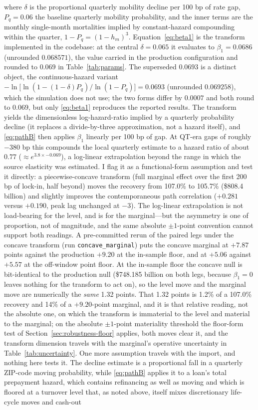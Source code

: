 \documentclass[12pt]{article}
\begin{document}
where $\delta$ is the proportional quarterly mobility decline per 100 bp of rate gap, $P_q = 0.06$ the baseline quarterly mobility probability, and the inner terms are the monthly single-month mortalities implied by constant-hazard compounding within the quarter, $1 - P_q = (1 - h_m)^3$. Equation~\eqref{eq:beta1} is the transform implemented in the codebase: at the central $\delta = 0.065$ it evaluates to $\beta_1 = 0.0686$ (unrounded $0.068571$), the value carried in the production configuration and rounded to $0.069$ in Table~\ref{tab:params}. The superseded $0.0693$ is a distinct object, the continuous-hazard variant $-\ln\!\big[\ln(1-(1-\delta)P_q)/\ln(1-P_q)\big] = 0.0693$ (unrounded $0.069258$), which the simulation does not use; the two forms differ by $0.0007$ and both round to $0.069$, but only \eqref{eq:beta1} reproduces the reported results. The transform yields the dimensionless log-hazard-ratio implied by a quarterly probability decline (it replaces a divide-by-three approximation, not a hazard itself), and \eqref{eq:pathB} then applies $\beta_1$ linearly per 100 bp of gap. At QT-era gaps of roughly $-380$ bp this compounds the local quarterly estimate to a hazard ratio of about $0.77$ ($\approx e^{3.8 \times -0.069}$), a log-linear extrapolation beyond the range in which the source elasticity was estimated. I flag it as a functional-form assumption and test it directly: a piecewise-concave transform (full marginal effect over the first 200 bp of lock-in, half beyond) moves the recovery from 107.0\% to 105.7\% (\$808.4 billion) and slightly improves the contemporaneous path correlation ($+0.281$ versus $+0.190$, peak lag unchanged at $-3$). The log-linear extrapolation is not load-bearing for the level, and is for the marginal---but the asymmetry is one of proportion, not of magnitude, and the same absolute $\pm 1$-point convention cannot support both readings. A pre-committed rerun of the paired legs under the concave transform (run \texttt{concave\_marginal}) puts the concave marginal at $+7.87$ points against the production $+9.20$ at the in-sample floor, and at $+5.06$ against $+5.57$ at the off-window point floor. At the in-sample floor the concave null is bit-identical to the production null (\$748.185 billion on both legs, because $\beta_1 = 0$ leaves nothing for the transform to act on), so the level move and the marginal move are numerically the \emph{same} 1.32 points. That 1.32 points is 1.2\% of a 107.0\% recovery and 14\% of a $+9.20$-point marginal, and it is that relative reading, not the absolute one, on which the transform is immaterial to the level and material to the marginal; on the absolute $\pm 1$-point materiality threshold the floor-form test of Section~\ref{sec:robustness-floor} applies, both moves clear it, and the transform dimension travels with the marginal's operative uncertainty in Table~\ref{tab:uncertainty}. One more assumption travels with the import, and nothing here tests it. The decline \citet{liebersohn2024} estimate is a proportional fall in a quarterly ZIP-code moving probability, while \eqref{eq:pathB} applies it to a loan's total prepayment hazard, which contains refinancing as well as moving and which is floored at a turnover level that, as noted above, itself mixes discretionary life-cycle moves and cash-out 
\end{document}
